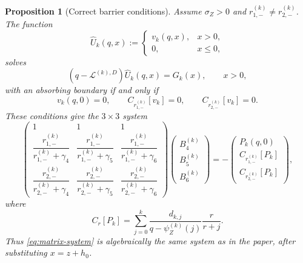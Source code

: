 \documentclass[11pt]{article}
\newcommand{\cL}{\mathcal{L}}
\theoremstyle{plain}
\newtheorem{proposition}{Proposition}
\theoremstyle{remark}
\begin{document}
\begin{proposition}[Correct barrier conditions]\label{prop:correct}
Assume $\sigma_Z>0$ and
$r_{1,-}^{(k)}\neq r_{2,-}^{(k)}$.  The function
\begin{equation}\label{eq:killed-candidate}
\widehat U_k(q,x):=
\begin{cases}
v_k(q,x),&x>0,\\
0,&x\leq0,
\end{cases}
\end{equation}
solves
\begin{equation}\label{eq:killed-resolvent}
(q-\cL^{(k),D})\widehat U_k(q,x)=G_k(x),
\qquad x>0,
\end{equation}
with an absorbing boundary if and only if
\begin{equation}\label{eq:three-conditions}
v_k(q,0)=0,
\qquad
C_{r_{1,-}^{(k)}}[v_k]=0,
\qquad
C_{r_{2,-}^{(k)}}[v_k]=0.
\end{equation}
These conditions give the $3\times3$ system
\begin{equation}\label{eq:matrix-system}
\begin{pmatrix}
1&1&1\\[5pt]
\dfrac{r_{1,-}^{(k)}}{r_{1,-}^{(k)}+\gamma_4}&
\dfrac{r_{1,-}^{(k)}}{r_{1,-}^{(k)}+\gamma_5}&
\dfrac{r_{1,-}^{(k)}}{r_{1,-}^{(k)}+\gamma_6}\\[11pt]
\dfrac{r_{2,-}^{(k)}}{r_{2,-}^{(k)}+\gamma_4}&
\dfrac{r_{2,-}^{(k)}}{r_{2,-}^{(k)}+\gamma_5}&
\dfrac{r_{2,-}^{(k)}}{r_{2,-}^{(k)}+\gamma_6}
\end{pmatrix}
\begin{pmatrix}B_4^{(k)}\\B_5^{(k)}\\B_6^{(k)}\end{pmatrix}
=-
\begin{pmatrix}
P_k(q,0)\\[3pt]
C_{r_{1,-}^{(k)}}[P_k]\\[3pt]
C_{r_{2,-}^{(k)}}[P_k]
\end{pmatrix},
\end{equation}
where
\begin{equation}\label{eq:particular-functional}
C_r[P_k]
=\sum_{j=0}^k
\frac{d_{k,j}}{q-\psi_Z^{(k)}(j)}\frac{r}{r+j}.
\end{equation}
Thus \eqref{eq:matrix-system} is algebraically the same system as in the
paper, after substituting $x=z+h_0$.
\end{proposition}
\end{document}
